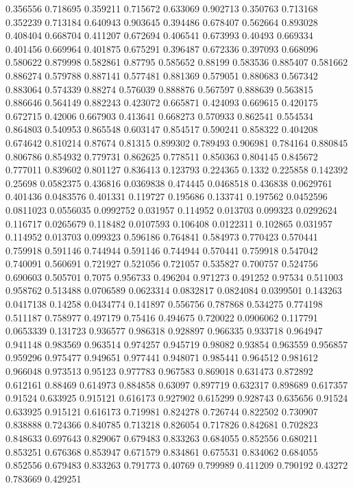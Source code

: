 0.356556 0.718695
0.359211 0.715672
0.633069 0.902713
0.350763 0.713168
0.352239 0.713184
0.640943 0.903645
0.394486 0.678407
0.562664 0.893028
0.408404 0.668704
0.411207 0.672694
0.406541 0.673993
0.40493 0.669334
0.401456 0.669964
0.401875 0.675291
0.396487 0.672336
0.397093 0.668096
0.580622 0.879998
0.582861 0.87795
0.585652 0.88199
0.583536 0.885407
0.581662 0.886274
0.579788 0.887141
0.577481 0.881369
0.579051 0.880683
0.567342 0.883064
0.574339 0.88274
0.576039 0.888876
0.567597 0.888639
0.563815 0.886646
0.564149 0.882243
0.423072 0.665871
0.424093 0.669615
0.420175 0.672715
0.42006 0.667903
0.413641 0.668273
0.570933 0.862541
0.554534 0.864803
0.540953 0.865548
0.603147 0.854517
0.590241 0.858322
0.404208 0.674642
0.810214 0.87674
0.81315 0.899302
0.789493 0.906981
0.784164 0.880845
0.806786 0.854932
0.779731 0.862625
0.778511 0.850363
0.804145 0.845672
0.777011 0.839602
0.801127 0.836413
0.123793 0.224365
0.1332 0.225858
0.142392 0.25698
0.0582375 0.436816
0.0369838 0.474445
0.0468518 0.436838
0.0629761 0.401436
0.0483576 0.401331
0.119727 0.195686
0.133741 0.197562
0.0452596 0.0811023
0.0556035 0.0992752
0.031957 0.114952
0.013703 0.099323
0.0292624 0.116717
0.0265679 0.118482
0.0107593 0.106408
0.0122311 0.102865
0.031957 0.114952
0.013703 0.099323
0.596186 0.764841
0.584973 0.770423
0.570441 0.759918
0.591146 0.744944
0.591146 0.744944
0.570441 0.759918
0.547042 0.740091
0.560691 0.721927
0.521056 0.721057
0.535827 0.700757
0.524756 0.690603
0.505701 0.7075
0.956733 0.496204
0.971273 0.491252
0.97534 0.511003
0.958762 0.513488
0.0706589 0.0623314
0.0832817 0.0824084
0.0399501 0.143263
0.0417138 0.14258
0.0434774 0.141897
0.556756 0.787868
0.534275 0.774198
0.511187 0.758977
0.497179 0.75416
0.494675 0.720022
0.0906062 0.117791
0.0653339 0.131723
0.936577 0.986318
0.928897 0.966335
0.933718 0.964947
0.941148 0.983569
0.963514 0.974257
0.945719 0.98082
0.93854 0.963559
0.956857 0.959296
0.975477 0.949651
0.977441 0.948071
0.985441 0.964512
0.981612 0.966048
0.973513 0.95123
0.977783 0.967583
0.869018 0.631473
0.872892 0.612161
0.88469 0.614973
0.884858 0.63097
0.897719 0.632317
0.898689 0.617357
0.91524 0.633925
0.915121 0.616173
0.927902 0.615299
0.928743 0.635656
0.91524 0.633925
0.915121 0.616173
0.719981 0.824278
0.726744 0.822502
0.730907 0.838888
0.724366 0.840785
0.713218 0.826054
0.717826 0.842681
0.702823 0.848633
0.697643 0.829067
0.679483 0.833263
0.684055 0.852556
0.680211 0.853251
0.676368 0.853947
0.671579 0.834861
0.675531 0.834062
0.684055 0.852556
0.679483 0.833263
0.791773 0.40769
0.799989 0.411209
0.790192 0.43272
0.783669 0.429251
